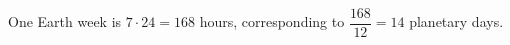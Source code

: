 One Earth week is $ 7\cdot24=168 $ hours, corresponding to $\dfrac{168}{12}=\boxed{14}$ planetary days.
